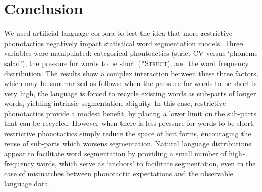 \documentclass[11pt]{article}
\begin{document}
\section{Conclusion}
\vspace*{-5pt}
We used artificial language corpora to test the idea that more restrictive phonotactics negatively impact statistical word segmentation models. Three variables were manipulated: categorical phontoactics (strict CV versus `phoneme salad'), the pressure for words to be short (\textsc{*Struct}), and the word frequency distribution. The results show a complex interaction between these three factors, which may be summarized as follows: when the pressure for words to be short is very high, the language is forced to recycle existing words as sub-parts of longer words, yielding intrinsic segmentation abiguity. In this case, restrictive phonotactics provide a modest benefit, by placing a lower limit on the sub-parts that can be recycled. However when there is less pressure for words to be short, restrictive phonotactics simply reduce the space of licit forms, encouraging the reuse of sub-parts which worsens segmentation. Natural language distributions appear to facilitate word segmentation by providing a small number of high-frequency words, which serve as `anchors' to facilitate segmentation, even in the case of mismatches between phonotactic expectations and the observable language data. %



\end{document}
